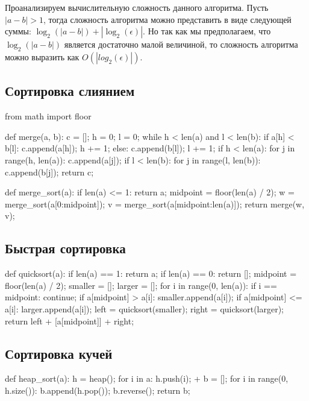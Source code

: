 Проанализируем вычислительную сложность данного алгоритма. 
Пусть $|a-b|>1$, тогда сложность алгоритма можно представить в виде 
следующей суммы: $\log_2(|a-b|) + |\log_2(\epsilon)|$. Но так как 
мы предполагаем, что $\log_2(|a-b|)$ является достаточно 
малой величиной, то сложность алгоритма можно выразить как 
$O(|log_2(\epsilon)|)$.


\subsection{Сортировка слиянием}

\begin{python}

from math import floor

def merge(a, b):
	c = [];
	h = 0;
	l = 0;
	while h < len(a) and l < len(b):
		if a[h] < b[l]:
			c.append(a[h]);
			h += 1;
		else:
			c.append(b[l]);
			l += 1;
	if h < len(a):
		for j in range(h, len(a)):
			c.append(a[j]);
	if l < len(b):
		for j in range(l, len(b)):
			c.append(b[j]);
	return c;

def merge_sort(a):
	if len(a) <= 1:
		return a;
	midpoint = floor(len(a) / 2);
	w = merge_sort(a[0:midpoint]);
	v = merge_sort(a[midpoint:len(a)]);
	return merge(w, v);
\end{python}

\subsection{Быстрая сортировка}

\begin{python}
def quicksort(a):
	if len(a) == 1:
		return a;
	if len(a) == 0:
		return [];
	midpoint = floor(len(a) / 2);
	smaller = [];
	larger  = [];
	for i in range(0, len(a)):
		if i == midpoint:
			continue;
		if a[midpoint] > a[i]:
			smaller.append(a[i]);
		if a[midpoint] <= a[i]:
			larger.append(a[i]);
	left = quicksort(smaller);
	right = quicksort(larger);
	return left + [a[midpoint]] + right;
\end{python}

\subsection{Сортировка кучей}

\begin{python}
def heap_sort(a):
	h = heap();
	for i in a:
		h.push(i);
 +	b = [];
	for i in range(0, h.size()):
		b.append(h.pop());
	b.reverse();
	return b;
\end{python}

